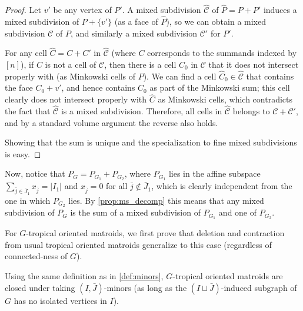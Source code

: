 \documentclass[letterpaper,reqno,11pt]{amsart}
\begin{document}
\begin{proof}
    Let $v'$ be any vertex of $P'$. A mixed subdivision $\hat{\mathcal{C}}$ of $\hat{P} = P + P'$ induces a mixed subdivision of $P + \{v'\}$ (as a face of $\hat{P}$), so we can obtain a mixed subdivision $\mathcal{C}$ of $P$, and similarly a mixed subdivision $\mathcal{C}'$ for $P'$. 
    
    For any cell $\hat{C} = C + C'$ in $\hat{\mathcal{C}}$ (where $C$ corresponds to the summands indexed by $[n]$), if $C$ is not a cell of $\mathcal{C}$, then there is a cell $C_0$ in $\mathcal{C}$ that it does not intersect properly with (as Minkowski cells of $P$). We can find a cell $\hat{C}_0 \in \hat{\mathcal{C}}$ that contains the face $C_0 + v'$, and hence contains $C_0$ as part of the Minkowski sum; this cell clearly does not intersect properly with $\hat{C}$ as Minkowski cells, which contradicts the fact that $\hat{\mathcal{C}}$ is a mixed subdivision. Therefore, all cells in $\hat{\mathcal{C}}$ belongs to $\mathcal{C} + \mathcal{C}'$, and by a standard volume argument the reverse also holds.

    Showing that the sum is unique and the specialization to fine mixed subdivisions is easy.
\end{proof}

Now, notice that $P_G = P_{G_1} + P_{G_2}$, where $P_{G_1}$ lies in the affine subspace $\sum_{\bar{j}\in \bar{J}_1} x_{\bar{j}} = |I_1|$ and $x_{\bar{j}} = 0$ for all $\bar{j}\notin \bar{J}_1$, which is clearly independent from the one in which $P_{G_2}$ lies. By \cref{prop:ms_decomp} this means that any mixed subdivision of $P_G$ is the sum of a mixed subdivision of $P_{G_1}$ and one of $P_{G_2}$. 

For $G$-tropical oriented matroids, we first prove that deletion and contraction from usual tropical oriented matroids generalize to this case (regardless of connected-ness of $G$).

\begin{proposition}
    Using the same definition as in \cref{def:minors}, $G$-tropical oriented matroids are closed under taking $(I, \bar{J})$-minors (as long as the $(I\sqcup \bar{J})$-induced subgraph of $G$ has no isolated vertices in $I$).
\end{proposition}
\end{document}
